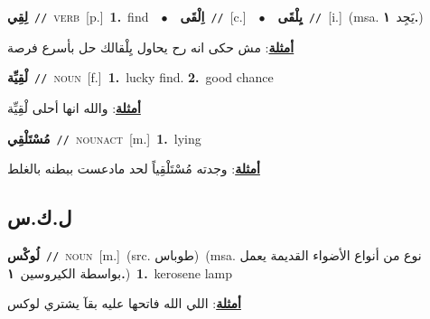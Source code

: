 \documentclass[10pt,a4paper,twoside]{article} %
\begin{document}
\begin{multicols}{2}
{\setlength\topsep{0pt}\textbf{\foreignlanguage{arabic}{لِقِي}}\ {\color{gray}\texttt{//}\color{black}}\ \textsc{verb}\ [p.]\ \textbf{1.}~find\ \ $\bullet$\ \ \setlength\topsep{0pt}\textbf{\foreignlanguage{arabic}{اِلْقَى}}\ {\color{gray}\texttt{//}\color{black}}\ [c.]\ \ $\bullet$\ \ \setlength\topsep{0pt}\textbf{\foreignlanguage{arabic}{يِلْقَى}}\ {\color{gray}\texttt{//}\color{black}}\ [i.]\ \color{gray}(msa. \foreignlanguage{arabic}{يَجِد}~\foreignlanguage{arabic}{\textbf{١.}})\color{black}\  \begin{flushright}\color{gray}\foreignlanguage{arabic}{\textbf{\underline{\foreignlanguage{arabic}{أمثلة}}}: مش حكى انه رح يحاول يِلْقالك حل بأسرع فرصة}\end{flushright}\color{black}} \vspace{2mm}

{\setlength\topsep{0pt}\textbf{\foreignlanguage{arabic}{لْقِيِّة}}\ {\color{gray}\texttt{//}\color{black}}\ \textsc{noun}\ [f.]\ \textbf{1.}~lucky find.  \textbf{2.}~good chance\  \begin{flushright}\color{gray}\foreignlanguage{arabic}{\textbf{\underline{\foreignlanguage{arabic}{أمثلة}}}: والله انها أحلى لْقِيِّة}\end{flushright}\color{black}} \vspace{2mm}

{\setlength\topsep{0pt}\textbf{\foreignlanguage{arabic}{مُسْتَلْقِي}}\ {\color{gray}\texttt{//}\color{black}}\ \textsc{noun\textunderscore act}\ [m.]\ \textbf{1.}~lying\  \begin{flushright}\color{gray}\foreignlanguage{arabic}{\textbf{\underline{\foreignlanguage{arabic}{أمثلة}}}: وجدته مُسْتَلْقِياً لحد مادعست ببطنه بالغلط}\end{flushright}\color{black}} \vspace{2mm}

\vspace{-3mm}
\subsection*{\color{blue}\foreignlanguage{arabic}{ل.ك.س}\color{blue}{}} 

{\setlength\topsep{0pt}\textbf{\foreignlanguage{arabic}{لُوكْس}}\ {\color{gray}\texttt{//}\color{black}}\ \textsc{noun}\ [m.]\ (src. \color{gray}\foreignlanguage{arabic}{طوباس}\color{black})\ \color{gray}(msa. \foreignlanguage{arabic}{نوع من أنواع الأضواء القديمة يعمل بواسطة الكيروسين}~\foreignlanguage{arabic}{\textbf{١.}})\color{black}\ \textbf{1.}~kerosene lamp\  \begin{flushright}\color{gray}\foreignlanguage{arabic}{\textbf{\underline{\foreignlanguage{arabic}{أمثلة}}}: اللي الله فاتحها عليه بقآ يشتري لوكس}\end{flushright}\color{black}} \vspace{2mm}


\end{multicols}
\end{document}

